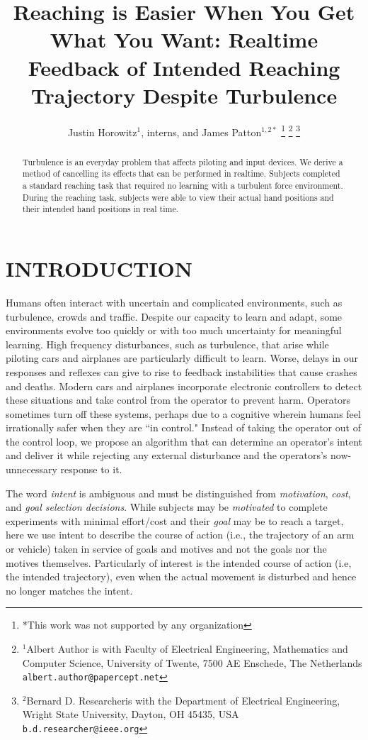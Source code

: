 \documentclass[letterpaper, 10 pt, conference]{ieeeconf}  %
\title{\LARGE \bf
Reaching is Easier When You Get What You Want: Realtime Feedback of Intended Reaching Trajectory Despite Turbulence
}
\author{Justin Horowitz$^{1}$, interns, and James Patton$^{1,2*}$%
\thanks{*This work was not supported by any organization}%
\thanks{$^{1}$Albert Author is with Faculty of Electrical Engineering, Mathematics and Computer Science,
       University of Twente, 7500 AE Enschede, The Netherlands
       {\tt\small albert.author@papercept.net}}%
\thanks{$^{2}$Bernard D. Researcheris with the Department of Electrical Engineering, Wright State University,
       Dayton, OH 45435, USA
       {\tt\small b.d.researcher@ieee.org}}%
}
\begin{document}
\maketitle
\thispagestyle{empty}
\pagestyle{empty}


\begin{abstract}
Turbulence is an everyday problem that affects piloting and input devices. We derive a method of cancelling its effects that can be performed in realtime. Subjects completed a standard reaching task that required no learning with a turbulent force environment. During the reaching task, subjects were able to view their actual hand positions and their intended hand positions in real time. 
\end{abstract}


\section{INTRODUCTION}

Humans often interact with uncertain and complicated environments, such as turbulence, crowds and traffic. Despite our capacity to learn and adapt, some environments evolve too quickly or with too much uncertainty for meaningful learning. High frequency disturbances, such as turbulence, that arise while piloting cars and airplanes are particularly difficult to learn. Worse, delays in our responses and reflexes can give to rise to feedback instabilities that cause crashes and deaths. Modern cars and airplanes incorporate electronic controllers to detect these situations and take control from the operator to prevent harm. Operators sometimes turn off these systems, perhaps due to a cognitive wherein humans feel irrationally safer when they are ``in control." Instead of taking the operator out of the control loop, we propose an algorithm that can determine an operator's intent and deliver it while rejecting any external disturbance and the operators's now-unnecessary response to it.

The word \textit{intent} is ambiguous and must be distinguished from \textit{motivation}\cite{mcclelland1985motives, rawolle2013relationships}, \textit{cost}\cite{todorov2002optimal, flash1985coordination}, and \textit{goal selection decisions}\cite{ziebart2010modeling}. While subjects may be \textit{motivated} to complete experiments with minimal effort/cost and their \textit{goal} may be to reach a target, here we use intent to describe the course of action (i.e., the trajectory of an arm or vehicle) taken in service of goals and motives and not the goals nor the motives themselves. Particularly of interest is the intended course of action (i.e, the intended trajectory), even when the actual movement is disturbed and hence no longer matches the intent.
\end{document}

